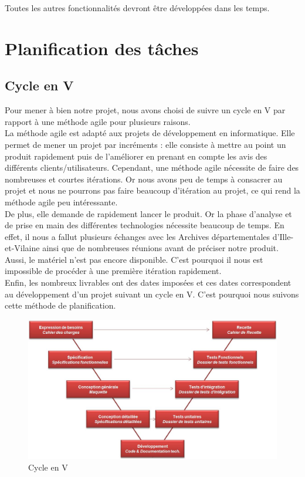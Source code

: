 \documentclass[a4paper]{article}
\begin{document}
	Toutes les autres fonctionnalités devront être développées dans les temps.
	
\section{Planification des tâches}
	
	\subsection{Cycle en V}
	
	Pour mener à bien notre projet, nous avons choisi de suivre un cycle en V par rapport à une méthode agile pour plusieurs raisons.\\
	
	La méthode agile est adapté aux projets de développement en informatique. Elle permet de mener un projet par incréments : elle consiste à mettre au point un produit rapidement puis de l'améliorer en prenant en compte les avis des différents clients/utilisateurs. Cependant, une méthode agile nécessite de faire des nombreuses et courtes itérations. Or nous avons peu de temps à consacrer au projet et nous ne pourrons pas faire beaucoup d'itération au projet, ce qui rend la méthode agile peu intéressante.\\
	
	De plus, elle demande de rapidement lancer le produit. Or la phase d'analyse et de prise en main des différentes technologies nécessite beaucoup de temps. En effet, il nous a fallut plusieurs échanges avec les Archives départementales d’Ille-et-Vilaine ainsi que de nombreuses réunions avant de préciser notre produit. Aussi, le matériel n'est pas encore disponible. C'est pourquoi il nous est impossible de procéder à une première itération rapidement.\\
	
	Enfin, les nombreux livrables ont des dates imposées et ces dates correspondent au développement d'un projet suivant un cycle en V. C'est pourquoi nous suivons cette méthode de planification.\\
	
\begin{figure}[H]
\centering
\includegraphics[width=\textwidth]{Cycle_en_V.jpg}
\caption{Cycle en V}
\label{fig:cycleenv}
\end{figure}
	
\end{document}
